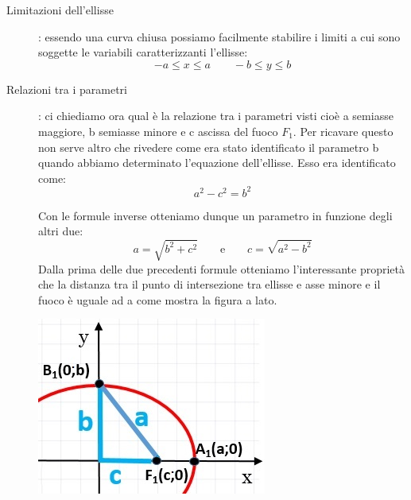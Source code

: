 \begin{description}
\item [Limitazioni dell'ellisse]: essendo una curva chiusa possiamo 
facilmente stabilire i limiti a cui sono soggette le variabili 
caratterizzanti l'ellisse:
\[-a \leq x \leq a \qquad -b\leq y \leq b\]

\item [Relazioni tra i parametri]: ci chiediamo ora qual è la relazione 
tra i parametri visti cioè a semiasse maggiore, b semiasse minore e c 
ascissa del fuoco $ F_{1} $. Per ricavare questo non serve altro che 
rivedere come era stato identificato il parametro b quando abbiamo 
determinato l'equazione dell'ellisse. Esso era identificato come: 
\[a^{2} - c^{2} = b^{2}\]

\begin{minipage}{.7\textwidth}
  Con le formule inverse otteniamo dunque un parametro in funzione 
degli altri due:
\[a=\sqrt{b^{2}+c^{2}} \qquad \text{e} \qquad c=\sqrt{a^{2}-b^{2}}\]
  Dalla prima delle due precedenti formule otteniamo l'interessante 
proprietà che la distanza tra il punto di intersezione tra ellisse e asse 
minore e il fuoco è uguale ad a come mostra la figura a lato.
\end{minipage}
\hspace{.2cm}
\begin{minipage}{.25\textwidth}
  \includegraphics[width=\textwidth]{img/abc.jpg}
\end{minipage}


\end{description}
